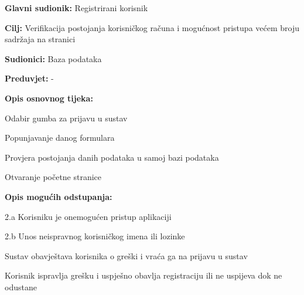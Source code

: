 \documentclass{article}
\begin{document}
		\begin{packed_item}
			
			\item \textbf{Glavni sudionik: }Registrirani korisnik
			\item  \textbf{Cilj:} Verifikacija postojanja korisničkog računa i mogućnost pristupa većem broju sadržaja na stranici
			\item  \textbf{Sudionici:} Baza podataka
			\item  \textbf{Preduvjet:} -
			\item  \textbf{Opis osnovnog tijeka:}
			
			\item[] \begin{packed_enum}
				\item Odabir gumba za prijavu u sustav 
				\item Popunjavanje danog formulara 
				\item Provjera postojanja danih podataka u samoj bazi podataka 
				\item Otvaranje početne stranice 
			\end{packed_enum}
			
			\item  \textbf{Opis mogućih odstupanja:}
			
			\item[] \begin{packed_item}
				
				\item[2.a] Korisniku je onemogućen pristup aplikaciji
				\item[2.b] Unos neispravnog korisničkog imena ili lozinke 
				\item[] \begin{packed_enum}
					\item Sustav obavještava korisnika o greški i vraća ga na prijavu u sustav  
					\item Korisnik ispravlja grešku i uspješno obavlja registraciju ili ne uspijeva dok ne odustane
				\end{packed_enum}
			\end{packed_item}
		\end{packed_item}	
		
\end{document}

